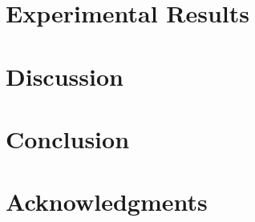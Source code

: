 \documentclass[12pt]{report}
\begin{document}
\chapter{Experimental Results}


\chapter{Discussion}


\chapter{Conclusion}


\chapter*{Acknowledgments}







\appendix
\chapter{}



%
\end{document}
